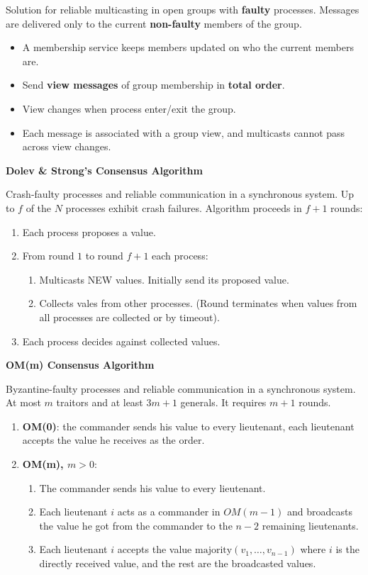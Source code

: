 \documentclass[a4paper, 10pt, twocolumn]{article}
\begin{document}
    Solution for reliable multicasting in open groups with \textbf{faulty} processes.
    Messages are delivered only to the current \textbf{non-faulty} members of the group.
    \begin{itemize}
        \item A membership service keeps members updated on who the current members are.
        \item Send \textbf{view messages} of group membership in \textbf{total order}.
        \item View changes when process enter/exit the group.
        \item Each message is associated with a group view, and multicasts cannot pass across view changes.
    \end{itemize}

    \textbf{Dolev \& Strong's Consensus Algorithm}

    Crash-faulty processes and reliable communication in a synchronous system.
    Up to $f$ of the $N$ processes exhibit crash failures.
    Algorithm proceeds in $f+1$ rounds:
    \begin{enumerate}
        \item Each process proposes a value.
        \item From round $1$ to round $f+1$ each process:
        \begin{enumerate}
            \item Multicasts NEW values. Initially send its proposed value.
            \item Collects vales from other processes. (Round terminates when values from all processes are collected or by timeout).
        \end{enumerate}
        \item Each process decides against collected values.
    \end{enumerate}

    \textbf{OM(m) Consensus Algorithm}

    Byzantine-faulty processes and reliable communication in a synchronous system.
    At most $m$ traitors and at least $3m + 1$ generals.
    It requires $m+1$ rounds.
    \begin{enumerate}
        \item \textbf{OM(0)}: the commander sends his value to every lieutenant, each lieutenant accepts the value he receives as the order.
        \item \textbf{OM(m), $m > 0$}:
        \begin{enumerate}
            \item The commander sends his value to every lieutenant.
            \item Each lieutenant $i$ acts as a commander in $OM(m-1)$ and broadcasts the value he got from the commander to the $n-2$ remaining lieutenants.
            \item Each lieutenant $i$ accepts the value $\text{majority}(v_1, \dots, v_{n-1})$ where $i$ is the directly received value, and the rest are the broadcasted values.
        \end{enumerate}
    \end{enumerate}
\end{document}
